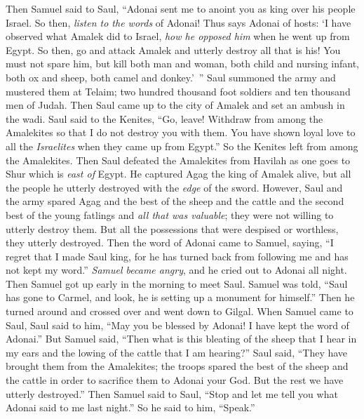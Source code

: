 \begin{biblechapter} %
 Then Samuel said to Saul, “Adonai sent me to anoint you as king over his people Israel. So then, \textit{listen to the words} of Adonai!
\verse Thus says Adonai of hosts: ‘I have observed what Amalek did to Israel, \textit{how he opposed him} when he went up from Egypt.
\verse So then, go and attack Amalek and utterly destroy all that is his! You must not spare him, but kill both man and woman, both child and nursing infant, both ox and sheep, both camel and donkey.’ ”
\verse Saul summoned the army and mustered them at Telaim; two hundred thousand foot soldiers and ten thousand men of Judah.
\verse Then Saul came up to the city of Amalek and set an ambush in the wadi.
\verse Saul said to the Kenites, “Go, leave! Withdraw from among the Amalekites so that I do not destroy you with them. You have shown loyal love to all the \textit{Israelites} when they came up from Egypt.” So the Kenites left from among the Amalekites.
\verse Then Saul defeated the Amalekites from Havilah as one goes to Shur which is \textit{east of} Egypt.
\verse He captured Agag the king of Amalek alive, but all the people he utterly destroyed with the \textit{edge} of the sword.
\verse However, Saul and the army spared Agag and the best of the sheep and the cattle and the second best of the young fatlings and \textit{all that was valuable}; they were not willing to utterly destroy them. But all the possessions that were despised or worthless, they utterly destroyed.
 Then the word of Adonai came to Samuel, saying,
\verse “I regret that I made Saul king, for he has turned back from following me and has not kept my word.” \textit{Samuel became angry}, and he cried out to Adonai all night.
\verse Then Samuel got up early in the morning to meet Saul. Samuel was told, “Saul has gone to Carmel, and look, he is setting up a monument for himself.” Then he turned around and crossed over and went down to Gilgal.
\verse When Samuel came to Saul, Saul said to him, “May you be blessed by Adonai! I have kept the word of Adonai.”
\verse But Samuel said, “Then what is this bleating of the sheep that I hear in my ears and the lowing of the cattle that I am hearing?”
\verse Saul said, “They have brought them from the Amalekites; the troops spared the best of the sheep and the cattle in order to sacrifice them to Adonai your God. But the rest we have utterly destroyed.”
\verse Then Samuel said to Saul, “Stop and let me tell you what Adonai said to me last night.” So he said to him, “Speak.”

\end{biblechapter}

